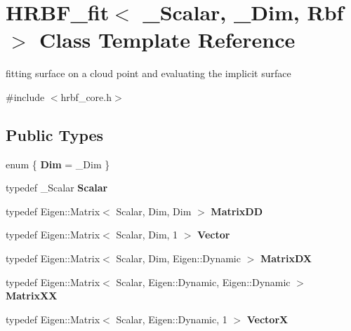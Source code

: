 \hypertarget{classHRBF__fit}{}\section{H\+R\+B\+F\+\_\+fit$<$ \+\_\+\+Scalar, \+\_\+\+Dim, Rbf $>$ Class Template Reference}
\label{classHRBF__fit}


fitting surface on a cloud point and evaluating the implicit surface  




{\ttfamily \#include $<$hrbf\+\_\+core.\+h$>$}

\subsection*{Public Types}
\begin{DoxyCompactItemize}
\item 
enum \{ {\bfseries Dim} = \+\_\+\+Dim
 \}\hypertarget{classHRBF__fit_ab6855a48623c9635a81f9363f27bff70}{}\label{classHRBF__fit_ab6855a48623c9635a81f9363f27bff70}

\item 
typedef \+\_\+\+Scalar {\bfseries Scalar}\hypertarget{classHRBF__fit_abd2a27baecfdd3613849eb42d9099e40}{}\label{classHRBF__fit_abd2a27baecfdd3613849eb42d9099e40}

\item 
typedef Eigen\+::\+Matrix$<$ Scalar, Dim, Dim $>$ {\bfseries Matrix\+DD}\hypertarget{classHRBF__fit_a280703141c1690df98cac85dc1e5c572}{}\label{classHRBF__fit_a280703141c1690df98cac85dc1e5c572}

\item 
typedef Eigen\+::\+Matrix$<$ Scalar, Dim, 1 $>$ {\bfseries Vector}\hypertarget{classHRBF__fit_ae8435f72ad3b66e35f7adf91387a056c}{}\label{classHRBF__fit_ae8435f72ad3b66e35f7adf91387a056c}

\item 
typedef Eigen\+::\+Matrix$<$ Scalar, Dim, Eigen\+::\+Dynamic $>$ {\bfseries Matrix\+DX}\hypertarget{classHRBF__fit_ae911329cb505e26d69bdec9f7ad91510}{}\label{classHRBF__fit_ae911329cb505e26d69bdec9f7ad91510}

\item 
typedef Eigen\+::\+Matrix$<$ Scalar, Eigen\+::\+Dynamic, Eigen\+::\+Dynamic $>$ {\bfseries Matrix\+XX}\hypertarget{classHRBF__fit_a36e8ad0f9cc046cb075e6b540c85e513}{}\label{classHRBF__fit_a36e8ad0f9cc046cb075e6b540c85e513}

\item 
typedef Eigen\+::\+Matrix$<$ Scalar, Eigen\+::\+Dynamic, 1 $>$ {\bfseries VectorX}\hypertarget{classHRBF__fit_ab2625bfd338440602efd1166d2c48cc8}{}\label{classHRBF__fit_ab2625bfd338440602efd1166d2c48cc8}

\end{DoxyCompactItemize}
